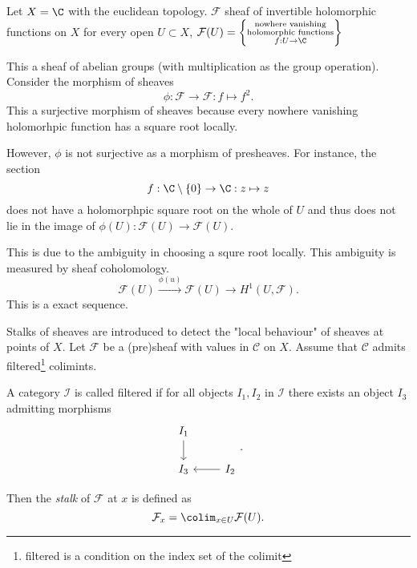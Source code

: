 \begin{example}
	Let $X = \C$ with the euclidean topology. $\mathcal{F} $ sheaf of invertible holomorphic functions on $X$ for every open $U\subset X$, 
	$\mathcal{F} (U) = \left\{\substack{\text{nowhere vanishing} \\ \text{holomorphic functions} \\ f : U \to \C}\right\} $

	This a sheaf of abelian groups (with multiplication as the group operation). Consider the morphism of sheaves \[
	\phi: \mathcal{F}  \to \mathcal{F} : f\mapsto  f^2
	.\] 
	This a surjective morphism of sheaves because every nowhere vanishing holomorhpic function has  a square root locally.

	However, $\phi$ is not surjective as a morphism of presheaves. 
	For instance, the section \[
	f: \C \setminus \{0\}  \to \C: z\mapsto z
	\] 
	does not have a holomorphpic square root on the whole of $U$ and thus does not lie in the image of $\phi(U): \mathcal{F} (U) \to \mathcal{F} (U)$. 

	This is due to the ambiguity in choosing a squre root locally.
	This ambiguity is measured by sheaf coholomology. 
	\[
		\mathcal{F}(U) \overset{\phi(u)}\to \mathcal{F} (U) \to H^1(U, \mathcal{F} )  
	.\] 
	This is a exact sequence.
\end{example}

Stalks of sheaves are introduced to  detect the "local behaviour" of sheaves at points of $X$. 
Let $\mathcal{F} $ be a (pre)sheaf with values in $\mathcal{C} $ on $X$.  Assume that $\mathcal{C}  $ admits filtered\footnote{filtered is a condition on the index set of the colimit} colimints.  
\begin{definition}
	A category $\mathcal{I}$ is called filtered if for all objects $I_1, I_2$ in $\mathcal{I} $ there  exists an object $I_3$ admitting morphisms 
	\[
	\begin{tikzcd}
		I_1 \arrow[d] \\
		I_3 & I_2 \arrow[l]
	\end{tikzcd}
	.\] 
\end{definition}
\begin{definition}
	Then  the \emph{stalk} of $\mathcal{F} $ at $x$ is defined as \[
		\mathcal{F} _x = \colim_{x \in U} \mathcal{F} (U)
	.\] 
\end{definition}
